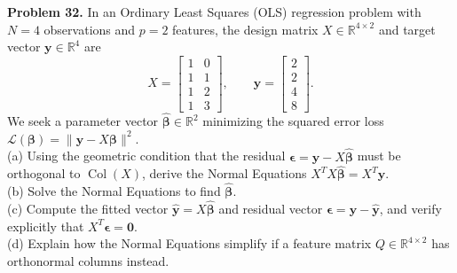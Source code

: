 \documentclass[11pt, letterpaper]{article}
\theoremstyle{definition}
\theoremstyle{remark}
\begin{document}
\textbf{Problem 32.} In an Ordinary Least Squares (OLS) regression problem with $N = 4$ observations and $p = 2$ features, the design matrix $X \in \mathbb{R}^{4 \times 2}$ and target vector $\mathbf{y} \in \mathbb{R}^4$ are
\[
X = \begin{bmatrix} 1 & 0 \\ 1 & 1 \\ 1 & 2 \\ 1 & 3 \end{bmatrix}, \qquad
\mathbf{y} = \begin{bmatrix} 2 \\ 2 \\ 4 \\ 8 \end{bmatrix}.
\]
We seek a parameter vector $\hat{\boldsymbol{\beta}} \in \mathbb{R}^2$ minimizing the squared error loss $\mathcal{L}(\boldsymbol{\beta}) = \|\mathbf{y} - X\boldsymbol{\beta}\|^2$. \\
(a) Using the geometric condition that the residual $\boldsymbol{\epsilon} = \mathbf{y} - X\hat{\boldsymbol{\beta}}$ must be orthogonal to $\operatorname{Col}(X)$, derive the Normal Equations $X^T X \hat{\boldsymbol{\beta}} = X^T \mathbf{y}$. \\
(b) Solve the Normal Equations to find $\hat{\boldsymbol{\beta}}$. \\
(c) Compute the fitted vector $\hat{\mathbf{y}} = X\hat{\boldsymbol{\beta}}$ and residual vector $\boldsymbol{\epsilon} = \mathbf{y} - \hat{\mathbf{y}}$, and verify explicitly that $X^T \boldsymbol{\epsilon} = \mathbf{0}$. \\
(d) Explain how the Normal Equations simplify if a feature matrix $Q \in \mathbb{R}^{4 \times 2}$ has orthonormal columns instead.
\end{document}
